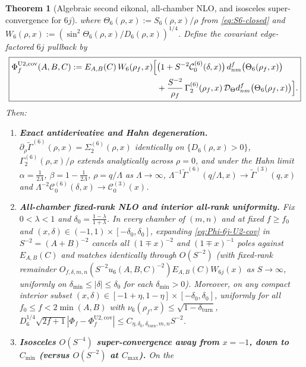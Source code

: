 \documentclass[11pt]{article}
\newtheorem{theorem}{Theorem}[section]
\theoremstyle{definition}
\theoremstyle{remark}
\newcommand{\cD}{\mathcal{D}}
\newcommand{\cC}{\mathcal{C}}
\renewcommand{\_}{\oldunderscore\penalty0\hskip0pt\relax}
\begin{document}
\begin{theorem}[Algebraic second eikonal, all-chamber NLO, and isosceles super-convergence for $6j$]
where $\Theta_6(\rho,x):=S_6(\rho,x)/\rho$ from \eqref{eq:S6-closed} and
  $W_6(\rho,x):=(\sin^2\Theta_6(\rho,x)/D_6(\rho,x))^{1/4}$. Define the covariant edge-factored $6j$ pullback by
\begin{equation}
  \boxed{\begin{aligned}\Phi_f^{\mathrm{U2,cov}}(A,B,C) :=
    E_{A,B}(C)\,W_6(\rho_f,x)\Bigl[&\bigl(1+S^{-2}\cC_0^{(6)}(\delta,x)\bigr)\,d^f_{nm}\bigl(\Theta_6(\rho_f,x)\bigr)\\ &+
    \frac{S^{-2}}{\rho_f}\,\Gamma_2^{(6)}(\rho_f,x)\,\cD_\Theta d^f_{nm}\bigl(\Theta_6(\rho_f,x)\bigr)\Bigr].\end{aligned}}
  \label{eq:Phi-6j-U2-cov}
\end{equation}
Then:
\begin{enumerate}[label=(\alph*),leftmargin=2em,itemsep=2pt]
\item \textbf{Exact antiderivative and Hahn degeneration.} $\partial_\rho\widetilde{\Gamma}^{(6)}(\rho,x)=\Sigma_2^{(6)}(\rho,x)$
  identically on $\{D_6(\rho,x)>0\}$, $\Gamma_2^{(6)}(\rho,x)/\rho$ extends analytically across $\rho=0$, and under the Hahn
  limit $\alpha=\frac{1}{2\Lambda}$, $\beta=1-\frac{1}{2\Lambda}$, $\rho=q/\Lambda$ as $\Lambda\to\infty$,
  $\Lambda^{-1}\widetilde{\Gamma}^{(6)}(q/\Lambda,x)\to\widetilde{\Gamma}^{(3)}(q,x)$ and
  $\Lambda^{-2}\cC_0^{(6)}(\delta,x)\to\cC_0^{(3)}(x)$.
\item \textbf{All-chamber fixed-rank NLO and interior all-rank uniformity.} Fix $0<\lambda<1$ and
  $\delta_0=\frac{1-\lambda}{1+\lambda}$. In every chamber of $(m,n)$ and at fixed $f\ge f_0$ and
  $(x,\delta)\in(-1,1)\times[-\delta_0,\delta_0]$, expanding \eqref{eq:Phi-6j-U2-cov} in $S^{-2}=(A+B)^{-2}$ cancels all $(1\mp
  x)^{-2}$ and $(1\mp x)^{-1}$ poles against $E_{A,B}(C)$ and matches
  \cite[Corollary~10.3, Eq.~(262)]{LewisFixedRank} identically through $O(S^{-2})$ (with fixed-rank remainder
  $O_{f,\delta,m,n}(S^{-2}u_6(A,B,C)^{-2})E_{A,B}(C)W_{6j}(x)$ as $S\to\infty$, uniformly on
  $\delta_{\min}\le|\delta|\le\delta_0$ for each $\delta_{\min}>0$). Moreover, on any compact interior subset
  $(x,\delta)\in[-1+\eta,1-\eta]\times[-\delta_0,\delta_0]$, uniformly for all $f_0\le f<2\min(A,B)$ with
  $\nu_6(\rho_f,x)\le\sqrt{1-\delta_{\mathrm{turn}}}$, $D_6^{1/4}\sqrt{2f+1}|\Phi_f-\Phi_f^{\mathrm{U2,cov}}|\le
  C_{\eta,\delta_0,\delta_{\mathrm{turn}},m,n}S^{-2}$.
\item \textbf{Isosceles $O(S^{-4})$ super-convergence away from $x=-1$, down to $C_{\min}$ (versus $O(S^{-2})$ at $C_{\max}$).} On the

\end{enumerate}
\end{theorem}
\end{document}
